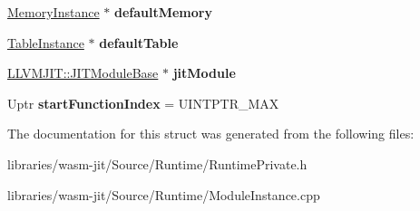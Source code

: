 \begin{DoxyCompactItemize}
\mbox{\hyperlink{struct_runtime_1_1_memory_instance}{Memory\+Instance}} $\ast$ {\bfseries default\+Memory}
\item 
\mbox{\label{struct_runtime_1_1_module_instance_a4b9cbe3016774341330e36d099934dd1}} 
\mbox{\hyperlink{struct_runtime_1_1_table_instance}{Table\+Instance}} $\ast$ {\bfseries default\+Table}
\item 
\mbox{\label{struct_runtime_1_1_module_instance_acb678c002fd8db66a7b610a4188094b5}} 
\mbox{\hyperlink{struct_l_l_v_m_j_i_t_1_1_j_i_t_module_base}{L\+L\+V\+M\+J\+I\+T\+::\+J\+I\+T\+Module\+Base}} $\ast$ {\bfseries jit\+Module}
\item 
\mbox{\label{struct_runtime_1_1_module_instance_a9758d1d7c64ccc35f19aeb4032fa0fd9}} 
Uptr {\bfseries start\+Function\+Index} = U\+I\+N\+T\+P\+T\+R\+\_\+\+M\+AX
\end{DoxyCompactItemize}


The documentation for this struct was generated from the following files\+:\begin{DoxyCompactItemize}
\item 
libraries/wasm-\/jit/\+Source/\+Runtime/Runtime\+Private.\+h\item 
libraries/wasm-\/jit/\+Source/\+Runtime/Module\+Instance.\+cpp\end{DoxyCompactItemize}
